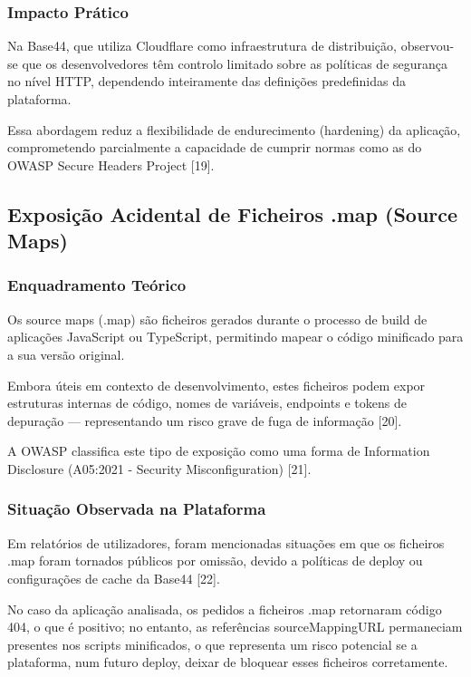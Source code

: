 \subsubsection{Impacto Prático}

Na Base44, que utiliza Cloudflare como infraestrutura de distribuição, observou-se que os desenvolvedores têm controlo limitado sobre as políticas de segurança no nível HTTP, dependendo inteiramente das definições predefinidas da plataforma.

Essa abordagem reduz a flexibilidade de endurecimento (hardening) da aplicação, comprometendo parcialmente a capacidade de cumprir normas como as do OWASP Secure Headers Project [19].

\subsection{Exposição Acidental de Ficheiros .map (Source Maps)}

\subsubsection{Enquadramento Teórico}

Os source maps (.map) são ficheiros gerados durante o processo de build de aplicações JavaScript ou TypeScript, permitindo mapear o código minificado para a sua versão original.

Embora úteis em contexto de desenvolvimento, estes ficheiros podem expor estruturas internas de código, nomes de variáveis, endpoints e tokens de depuração — representando um risco grave de fuga de informação [20].

A OWASP classifica este tipo de exposição como uma forma de Information Disclosure (A05:2021 - Security Misconfiguration) [21].

\subsubsection{Situação Observada na Plataforma}

Em relatórios de utilizadores, foram mencionadas situações em que os ficheiros .map foram tornados públicos por omissão, devido a políticas de deploy ou configurações de cache da Base44 [22].

No caso da aplicação analisada, os pedidos a ficheiros .map retornaram código 404, o que é positivo; no entanto, as referências sourceMappingURL permaneciam presentes nos scripts minificados, o que representa um risco potencial se a plataforma, num futuro deploy, deixar de bloquear esses ficheiros corretamente.

